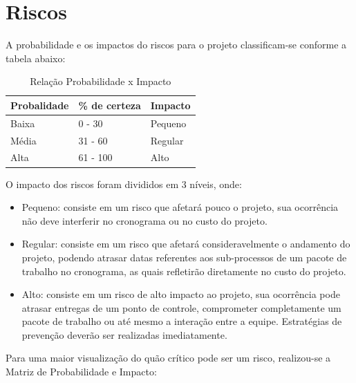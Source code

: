       \vfill
      \pagebreak


  \section{Riscos}

    A probabilidade e os impactos do riscos para o projeto classificam-se conforme a tabela abaixo:

  \begin{table}[!htbp]
    \begin{center}
    \caption{\label{probabilidadeximpacto}Relação Probabilidade x Impacto}
    \begin{tabular}{|l|l|l|}
    \hline
    \textbf{Probalidade} & \textbf{\% de certeza} & \textbf{Impacto} \\ \hline\hline
    Baixa                & 0 - 30                 & Pequeno          \\ \hline
    Média                & 31 - 60                & Regular          \\ \hline
    Alta                 & 61 - 100               & Alto             \\ \hline
    \end{tabular}
    \end{center}
  \end{table}

  O impacto dos riscos foram divididos em 3 níveis, onde:

  \begin{itemize}
    \item Pequeno: consiste em um risco que afetará pouco o projeto, sua ocorrência não deve interferir no cronograma ou no
    custo do projeto.
    \item Regular: consiste em um risco que afetará consideravelmente o andamento do projeto, podendo atrasar datas referentes
    aos sub-processos de um pacote de trabalho no cronograma, as quais refletirão diretamente no custo do projeto.
    \item Alto: consiste em um risco de alto impacto ao projeto, sua ocorrência pode atrasar entregas de um ponto de controle,
    comprometer completamente um pacote de trabalho ou até mesmo a interação entre a equipe. Estratégias de prevenção deverão
    ser realizadas imediatamente.
  \end{itemize}

  Para uma maior visualização do quão crítico pode ser um risco, realizou-se a Matriz de Probabilidade e Impacto:

